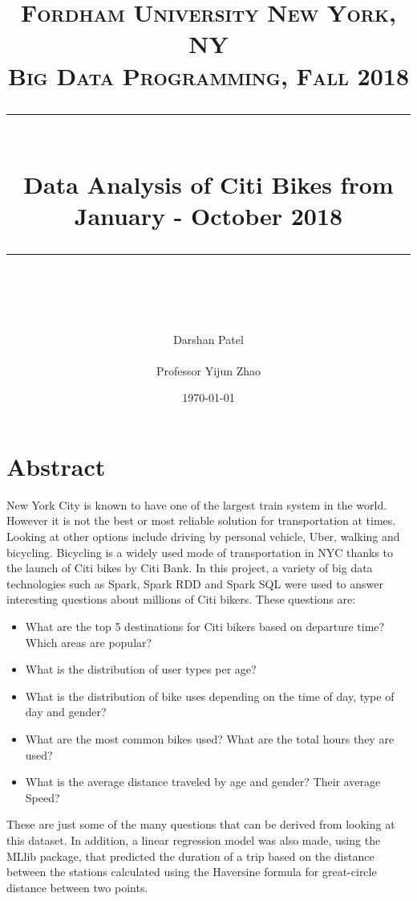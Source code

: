 \documentclass{article}
\title{
\normalfont \normalsize 
\textsc{Fordham University New York, NY \\ 
Big Data Programming, Fall 2018} \\
[10pt] 
\rule{\linewidth}{0.35pt} \\[12pt] 
\LARGE Data Analysis of Citi Bikes from January - October 2018 
\rule{\linewidth}{2pt}  \\[10pt]
}
\author{Darshan Patel \\~\\ Professor Yijun Zhao}
\date{\normalsize \today}
\begin{document}
\maketitle
\noindent
\tableofcontents

\newpage
\section{Abstract}
New York City is known to have one of the largest train system in the world. However it is not the best or most reliable solution for transportation at times. Looking at other options include driving by personal vehicle, Uber, walking and bicycling. Bicycling is a widely used mode of transportation in NYC thanks to the launch of Citi bikes by Citi Bank. In this project, a variety of big data technologies such as Spark, Spark RDD and Spark SQL were used to answer interesting questions about millions of Citi bikers. These questions are: 
\begin{itemize} 
\item What are the top 5 destinations for Citi bikers based on departure time? Which areas are popular? 
\item What is the distribution of user types per age? 
\item What is the distribution of bike uses depending on the time of day, type of day and gender? 
\item What are the most common bikes used? What are the total hours they are used? 
\item What is the average distance traveled by age and gender? Their average Speed? 
\end{itemize} 
These are just some of the many questions that can be derived from looking at this dataset. In addition, a linear regression model was also made, using the MLlib package, that predicted the duration of a trip based on the distance between the stations calculated using the Haversine formula for great-circle distance between two points. 

\newpage
\end{document}
